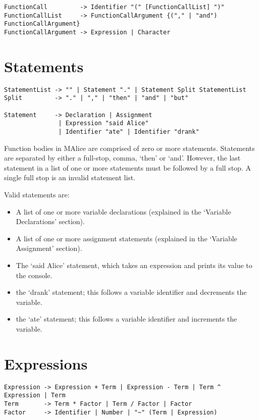 \documentclass[a4wide, 11pt]{article}
\begin{document}
\begin{verbatim}
FunctionCall         -> Identifier "(" [FunctionCallList] ")"
FunctionCallList     -> FunctionCallArgument {("," | "and") FunctionCallArgument}
FunctionCallArgument -> Expression | Character
\end{verbatim}

\section{Statements}

\begin{verbatim}
StatementList -> "" | Statement "." | Statement Split StatementList
Split         -> "." | "," | "then" | "and" | "but"

Statement     -> Declaration | Assignment
               | Expression "said Alice"
               | Identifier "ate" | Identifier "drank"
\end{verbatim}

Function bodies in MAlice are comprised of zero or more statements. Statements are separated by either a full-stop, comma, `then' or `and'. However, the last statement in a list of one or more statements must be followed by a full stop. A single full stop is an invalid statement list.

Valid statements are:
\begin{itemize}

\item A list of one or more variable declarations (explained in the `Variable Declarations' section).
\item A list of one or more assignment statements (explained in the `Variable Assignment' section).
\item The `said Alice' statement, which takes an expression and prints its value to the console.
\item the `drank' statement; this follows a variable identifier and decrements the variable.
\item the `ate' statement; this follows a variable identifier and increments the variable.

\end{itemize}
  
\section{Expressions}

\begin{verbatim}
Expression -> Expression + Term | Expression - Term | Term ^ Expression | Term
Term       -> Term * Factor | Term / Factor | Factor
Factor     -> Identifier | Number | "~" (Term | Expression)

\end{verbatim}
\end{document}
